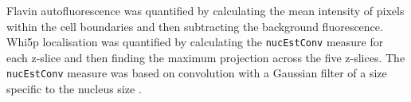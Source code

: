 Flavin autofluorescence was quantified by calculating the mean intensity of pixels within the cell boundaries and then subtracting the background fluorescence. %
Whi5p localisation was quantified by calculating the \texttt{nucEstConv} measure for each z-slice and then finding the maximum projection across the five z-slices.
The \texttt{nucEstConv} measure was based on convolution with a Gaussian filter of a size specific to the nucleus size \citep{geronHandsOnMachineLearning2017}.

